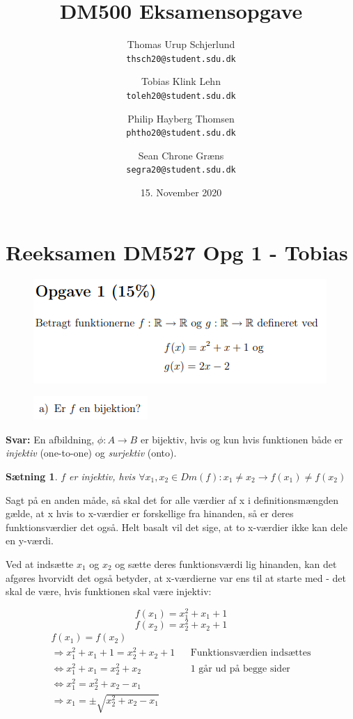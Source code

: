 \documentclass{article}
\title{DM500 Eksamensopgave}
\author{
	Thomas Urup Schjerlund\\
	\texttt{thsch20@student.sdu.dk}
	\and
	Tobias Klink Lehn\\
	\texttt{toleh20@student.sdu.dk}
	\and
	Philip Hayberg Thomsen\\
	\texttt{phtho20@student.sdu.dk}
	\and
	Sean Chrone Græns\\
	\texttt{segra20@student.sdu.dk}
}
\date{15. November 2020}
\newtheorem{theorem}{Sætning}
\begin{document}
\begin{titlepage}
\maketitle
\end{titlepage}

\section{Reeksamen DM527 Opg 1 - Tobias}
\begin{figure}[h]
\includegraphics[scale=1]{Opgave1Formulering}
\end{figure}

\begin{figure}[h]
\includegraphics[scale=1]{opga}
\end{figure}
\textbf{Svar:}
En afbildning, $\phi: A \rightarrow B$ er bijektiv, hvis og kun hvis funktionen både er \emph{injektiv} (one-to-one) og \emph{surjektiv} (onto).

\begin{theorem}
$f$ er injektiv, hvis $\forall x_1, x_2 \in Dm(f): x_1 \neq x_2 \rightarrow f(x_1) \neq f(x_2)$
\end{theorem}

Sagt på en anden måde, så skal det for alle værdier af x i definitionsmængden gælde, at x hvis to x-værdier er forskellige fra hinanden, så er deres funktionsværdier det også. Helt basalt vil det sige, at to x-værdier ikke kan dele en y-værdi.

Ved at indsætte $x_1$ og $x_2$ og sætte deres funktionsværdi lig hinanden, kan det afgøres hvorvidt det også betyder, at x-værdierne var ens til at starte med - det skal de være, hvis funktionen skal være injektiv:
\begin{center}
\[f(x_1) = x_1^2 + x_1 + 1 \] 
\[ f(x_2)=x_2^2 + x_2 + 1 \] 
\begin{align*}
f(x_1) = f(x_2) \\
\Rightarrow x^2_1 + x_1 + 1 = x^2_2 + x_2 + 1 && \text{Funktionsværdien indsættes} \\
\Leftrightarrow x^2_1 + x_1 = x^2_2 + x_2 && \text{1 går ud på begge sider} \\
\Leftrightarrow x_1^2 = x_2^2 + x_2 - x_1 \\
\Rightarrow x_1 = \pm\sqrt{x_2^2 + x_2 - x_1} \\
\end{align*}
\end{center}
\end{document}
